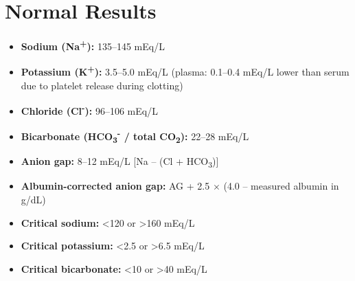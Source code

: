 \section*{Normal Results}
\begin{itemize}
  \item \textbf{Sodium (Na\textsuperscript{+}):} 135--145 mEq/L
  \item \textbf{Potassium (K\textsuperscript{+}):} 3.5--5.0 mEq/L (plasma: 0.1--0.4 mEq/L lower than serum due to platelet release during clotting)
  \item \textbf{Chloride (Cl\textsuperscript{-}):} 96--106 mEq/L
  \item \textbf{Bicarbonate (HCO\textsubscript{3}\textsuperscript{-} / total CO\textsubscript{2}):} 22--28 mEq/L
  \item \textbf{Anion gap:} 8--12 mEq/L [Na -- (Cl + HCO\textsubscript{3})]
  \item \textbf{Albumin-corrected anion gap:} AG + 2.5 $\times$ (4.0 -- measured albumin in g/dL)
  \item \textbf{Critical sodium:} <120 or >160 mEq/L
  \item \textbf{Critical potassium:} <2.5 or >6.5 mEq/L
  \item \textbf{Critical bicarbonate:} <10 or >40 mEq/L \cite{fischbach2023manual}
\end{itemize}


